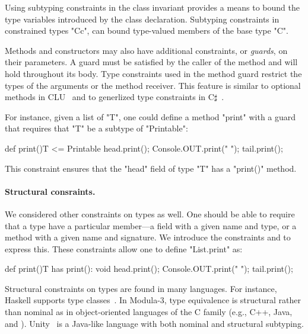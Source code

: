 Using subtyping constraints in the class invariant provides a
means to bound the type variables introduced by the class
declaration.  Subtyping constraints in constrained types
\xcd"C{c}", can bound
type-valued members of the base type \xcd"C".

Methods and constructors
may also have additional
constraints, or \emph{guards}, on their parameters.  A
guard must be satisfied by the caller of the method and
will hold throughout its body.  Type constraints used in the
method guard restrict the types of the arguments or the method
receiver.  
This feature is similar to optional methods in CLU~\cite{clu} and to generlized type constraints in C$\sharp$~\cite{emir06}.

For instance, given a list of \xcd"T", one could define a
method \xcd"print" with a guard that requires that \xcd"T" be a
subtype of \xcd"Printable":
\begin{xtenmathnoindent}
  def print(){T <= Printable} {
    head.print();
    Console.OUT.print(" ");
    tail.print();
  }
\end{xtenmathnoindent}
This constraint ensures that the \xcd"head" field of type
\xcd"T" has a \xcd"print()" method.

\paragraph{Structural consraints.}
We considered other constraints on types as well.
One should
be able to require that a type have a
particular member---a field with a given name and type, or a method
with a given name and signature.
We introduce the constraints 
   and  
 to express this.
These
constraints allow one to define \xcd"List.print" as:
\begin{xtenmathnoindent}
  def print(){T has print(): void} {
    head.print();
    Console.OUT.print(" ");
    tail.print();
  }
\end{xtenmathnoindent}

Structural constraints on types are found in many languages.
For instance,
Haskell supports type
classes~\cite{haskell,haskell-type-classes}.
%
In Modula-3, type equivalence is structural
rather than nominal as in object-oriented languages of the C
family (e.g., C++, Java, and \Xten{}).
Unity~\cite{malayeriIntegrating08}
is a Java-like language with both nominal and structural subtyping.

